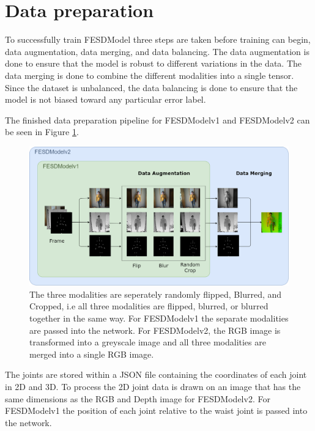 \section{Data preparation}
\label{sec:data_preparation}

To successfully train FESDModel three steps are taken before training can begin, data augmentation, data merging, and data balancing. The data augmentation is done to ensure that the model is robust to different variations in the data. The data merging is done to combine the different modalities into a single tensor. Since the dataset is unbalanced, the data balancing is done to ensure that the model is not biased toward any particular error label. 

The finished data preparation pipeline for FESDModelv1 and FESDModelv2 can be seen in Figure \ref{fig:data_preparation_pipeline}.

\begin{figure}[ht]
  \centering
  \includegraphics[width=\linewidth]{figures/ProcessingPipeline/DataProcessing.png}
  \caption[Data preparation pipeline for FESDModel]{The three modalities are seperately randomly flipped, Blurred, and Cropped, i.e all three modalities are flipped, blurred, or blurred together in the same way. For FESDModelv1 the separate modalities are passed into the network. For FESDModelv2, the RGB image is transformed into a greyscale image and all three modalities are merged into a single RGB image.}
  \label{fig:data_preparation_pipeline}
\end{figure}

The joints are stored within a JSON file containing the coordinates of each joint in 2D and 3D. To process the 2D joint data is drawn on an image that has the same dimensions as the RGB and Depth image for FESDModelv2. For FESDModelv1 the position of each joint relative to the waist joint is passed into the network.

